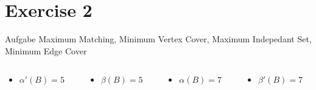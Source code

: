 
\section{Exercise 2}

\setcounter{exercise}{1}

\begin{frame}[allowframebreaks]{Aufgabe \thesection}{\small Maximum Matching, Minimum Vertex Cover, Maximum Indepedant Set, Minimum Edge Cover}
  \begin{columns}
    \begin{column}{0.25\textwidth}
      \begin{itemize}
        \item $\alpha'(B) = 5$
      \end{itemize}
    \end{column}
    \begin{column}{0.25\textwidth}
      \begin{itemize}
        \item $\beta(B) = 5$
      \end{itemize}
    \end{column}
    \begin{column}{0.25\textwidth}
      \begin{itemize}
        \item $\alpha(B) = 7$
      \end{itemize}
    \end{column}
    \begin{column}{0.25\textwidth}
      \begin{itemize}
        \item $\beta'(B) = 7$
      \end{itemize}
    \end{column}
  \end{columns}
\end{frame}
